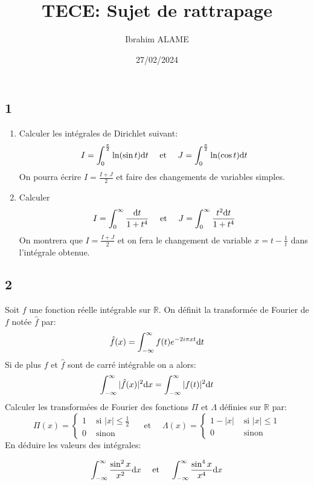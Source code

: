\documentclass{article}[11pt]
\title{TECE: Sujet de rattrapage}
\author{Ibrahim ALAME}
\date{27/02/2024}
\def \de {{\rm d}}
\begin{document}
\maketitle

\subsection*{1}
\begin{enumerate}
\item Calculer les intégrales de Dirichlet suivant:
\[I=\int_0^{\frac{\pi}{2}}\ln(\sin t)\de t \quad \mbox{ et }\quad J=\int_0^{\frac{\pi}{2}}\ln(\cos t)\de t \]
On pourra écrire $\displaystyle I=\frac{I+J}{2}$ et faire des changements de variables simples.
\item Calculer 
\[I=\int_0^{\infty}\frac{\de t}{1+t^4}\quad \mbox{ et }\quad J=\int_0^{\infty} \frac{t^2\de t}{1+t^4} \]
On montrera que $\displaystyle I=\frac{I+J}{2}$  et on fera le changement de variable $x=t-\frac 1t$ dans l'intégrale obtenue.
\end{enumerate}
\subsection*{2}
Soit $f$ une fonction réelle intégrable sur $\mathbb{R}$. On définit la transformée de Fourier de $f$ notée $\hat{f} $ par:
\[\hat{f}(x)=\int_{-\infty}^\infty f(t) e^{-2i\pi x t}\de t\]
Si de plus $f$ et $\hat{f}$ sont de carré intégrable on a alors:
\[\int_{-\infty}^\infty |\hat{f}(x)|^2 \de x =\int_{-\infty}^\infty |f(t)|^2 \de t\]
Calculer les transformées de Fourier des fonctions $\Pi$ et $\Lambda$ définies sur $\mathbb{R}$ par:
\[\Pi(x)=\left\{\begin{array}{ll} 1 &\mbox{ si } |x|\leq \frac 12\\
0 &\mbox{ sinon } \end{array}\right.\quad \mbox{ et }\quad \Lambda(x)=\left\{\begin{array}{ll} 1- |x| &\mbox{ si } |x| \leq 1 \\
0 &\mbox{ sinon } \end{array}\right.\]
En déduire les valeurs des intégrales:

\[\int_{-\infty}^\infty \frac{\sin^2x}{x^2} \de x \quad \mbox{ et }\quad\int_{-\infty}^\infty  \frac{\sin^4x}{x^4} \de x\]
\end{document}
